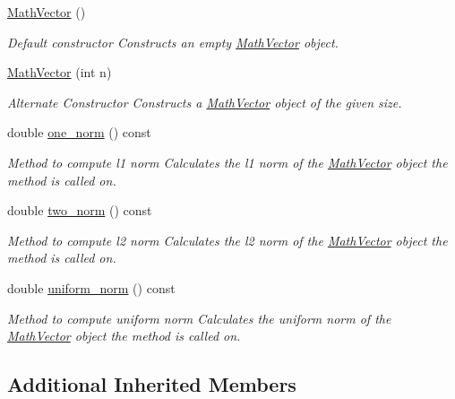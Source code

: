 \begin{DoxyCompactItemize}
\item 
\hypertarget{class_math_vector_abdc8fb8fe19c134b8f0816e94e54a9e0}{\hyperlink{class_math_vector_abdc8fb8fe19c134b8f0816e94e54a9e0}{Math\-Vector} ()}\label{class_math_vector_abdc8fb8fe19c134b8f0816e94e54a9e0}

\begin{DoxyCompactList}\small\item\em Default constructor Constructs an empty \hyperlink{class_math_vector}{Math\-Vector} object. \end{DoxyCompactList}\item 
\hyperlink{class_math_vector_a3822f72b57908f7b654c9a4bd5274195}{Math\-Vector} (int n)
\begin{DoxyCompactList}\small\item\em Alternate Constructor Constructs a \hyperlink{class_math_vector}{Math\-Vector} object of the given size. \end{DoxyCompactList}\item 
double \hyperlink{class_math_vector_a57b56d1c6b73a67d8ae726e214b23f9c}{one\-\_\-norm} () const 
\begin{DoxyCompactList}\small\item\em Method to compute l1 norm Calculates the l1 norm of the \hyperlink{class_math_vector}{Math\-Vector} object the method is called on. \end{DoxyCompactList}\item 
double \hyperlink{class_math_vector_a2530b18d79b56e56265ec756350ef55b}{two\-\_\-norm} () const 
\begin{DoxyCompactList}\small\item\em Method to compute l2 norm Calculates the l2 norm of the \hyperlink{class_math_vector}{Math\-Vector} object the method is called on. \end{DoxyCompactList}\item 
double \hyperlink{class_math_vector_a7cac92227575f480c3fd342e9510ce0b}{uniform\-\_\-norm} () const 
\begin{DoxyCompactList}\small\item\em Method to compute uniform norm Calculates the uniform norm of the \hyperlink{class_math_vector}{Math\-Vector} object the method is called on. \end{DoxyCompactList}\end{DoxyCompactItemize}
\subsection*{Additional Inherited Members}


